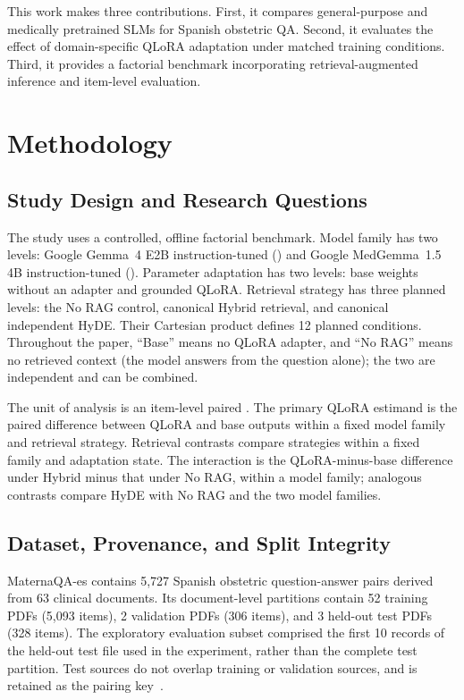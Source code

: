 This work makes three contributions. First, it compares general-purpose and
medically pretrained SLMs for Spanish obstetric QA. Second, it evaluates
the effect of domain-specific QLoRA adaptation under matched training
conditions. Third, it provides a factorial benchmark incorporating
retrieval-augmented inference and item-level evaluation.

\section{Methodology}
\subsection{Study Design and Research Questions}
The study uses a controlled, offline factorial benchmark. Model family has
two levels: Google Gemma~4 E2B instruction-tuned
() and Google MedGemma~1.5 4B instruction-tuned
(). Parameter adaptation has two levels:
base weights without an adapter and grounded QLoRA. Retrieval strategy has
three planned levels: the No RAG control, canonical
Hybrid retrieval, and canonical independent HyDE. Their Cartesian product
defines 12 planned conditions. Throughout the paper, ``Base'' means no
QLoRA adapter, and ``No RAG'' means no retrieved context (the model answers
from the question alone); the two are independent and can be combined.

The unit of analysis is an item-level paired . The primary
QLoRA estimand is the paired difference between QLoRA and base outputs
within a fixed model family and retrieval strategy. Retrieval contrasts
compare strategies within a fixed family and adaptation state. The
interaction is the QLoRA-minus-base difference under Hybrid minus that
under No RAG, within a model family; analogous contrasts compare HyDE
with No RAG and the two model families.

\subsection{Dataset, Provenance, and Split Integrity}
MaternaQA-es contains 5,727 Spanish obstetric question-answer pairs derived
from 63 clinical documents. Its document-level partitions contain 52
training PDFs (5,093 items), 2 validation PDFs (306 items), and 3 held-out
test PDFs (328 items). The exploratory evaluation subset comprised the
first 10 records of the held-out test file used in the experiment, rather
than the complete test partition. Test sources do not overlap training or
validation sources, and  is retained as the pairing
key~\cite{maternaqa2026}.

